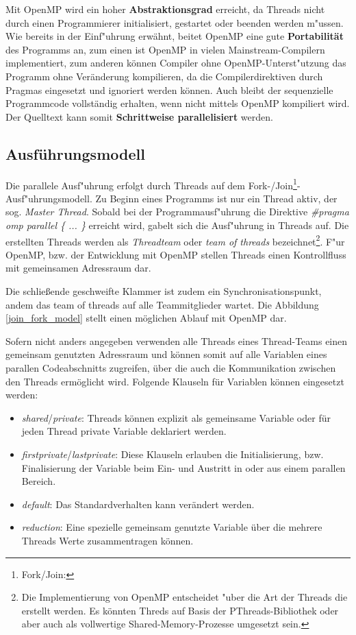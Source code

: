 \documentclass[11pt]{scrartcl}
\begin{document}
Mit OpenMP wird ein hoher \textbf{Abstraktionsgrad} erreicht, da Threads nicht durch einen Programmierer initialisiert, gestartet oder beenden werden m"ussen. Wie bereits in der Einf"uhrung erwähnt, beitet OpenMP eine gute \textbf{Portabilität} des Programms an, zum einen ist OpenMP in vielen Mainstream-Compilern implementiert, zum anderen können Compiler ohne OpenMP-Unterst"utzung das Programm ohne Veränderung kompilieren, da die Compilerdirektiven durch Pragmas eingesetzt und ignoriert werden können. Auch bleibt der sequenzielle Programmcode vollständig erhalten, wenn nicht mittels OpenMP kompiliert wird. Der Quelltext kann somit \textbf{Schrittweise parallelisiert} werden. 

\subsection{Ausführungsmodell}

Die parallele Ausf"uhrung erfolgt durch Threads auf dem
Fork-/Join\footnote{Fork/Join:}-Ausf"uhrungsmodell. Zu Beginn eines Programms ist nur ein Thread aktiv, der sog. \textit{Master Thread}. Sobald bei der Programmausf"uhrung die Direktive \textit{\#pragma omp parallel \{ ... \} } erreicht wird, gabelt sich die
Ausf"uhrung in Threads auf. Die erstellten Threads werden als \textit{Threadteam} oder \textit{team of threads}
bezeichnet\footnote{Die Implementierung von OpenMP entscheidet "uber die Art der Threads die erstellt werden. Es könnten Threds auf Basis der PThreads-Bibliothek oder aber auch als vollwertige Shared-Memory-Prozesse umgesetzt sein.}. F"ur OpenMP, bzw. der Entwicklung mit OpenMP stellen Threads einen Kontrollfluss mit gemeinsamen Adressraum dar.

Die schließende geschweifte Klammer ist zudem ein Synchronisationspunkt, andem das team of threads auf alle Teammitglieder wartet. Die Abbildung \ref{join_fork_model} stellt einen möglichen Ablauf mit OpenMP dar.

Sofern nicht anders angegeben verwenden alle Threads eines Thread-Teams einen gemeinsam genutzten Adressraum und können somit auf alle Variablen eines parallen Codeabschnitts zugreifen, über die auch die Kommunikation zwischen den Threads ermöglicht wird. Folgende Klauseln für Variablen können eingesetzt werden:

\begin{itemize}
\item \textit{shared}/\textit{private}: Threads können explizit als gemeinsame Variable oder für jeden Thread private Variable deklariert werden.
\item \textit{firstprivate}/\textit{lastprivate}: Diese Klauseln erlauben die Initialisierung, bzw. Finalisierung der Variable beim Ein- und Austritt in oder aus einem parallen Bereich.
\item \textit{default}: Das Standardverhalten kann verändert werden. %
\item \textit{reduction}: Eine spezielle gemeinsam genutzte Variable über die mehrere Threads Werte zusammentragen können.
\end{itemize}
\end{document}
